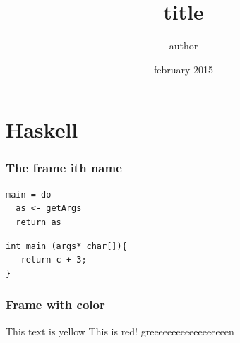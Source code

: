 \documentclass[12pt,a4paper]{article}
\begin{document}
\title{title}
\author{author}
\date{february 2015}
\maketitle
\restoregeometry
{}


\tableofcontents

\section{Haskell}

\begin{frame}\frametitle{The frame ith name}
\lstset{language=haskell}
\begin{lstlisting}[frame=single]
main = do
  as <- getArgs
  return as
\end{lstlisting} 

 \lstset{language=C}
\begin{lstlisting}[frame=none]
int main (args* char[]){
   return c + 3;
}
\end{lstlisting}
\end{frame}

\begin{frame}\frametitle{Frame with color}
{\color{yellow}This text is yellow} 
 {\color{red}This is red!} 
 {\color{green}greeeeeeeeeeeeeeeeeen} 

 \begin{center}\end{center}
\end{frame}
\end{document}
